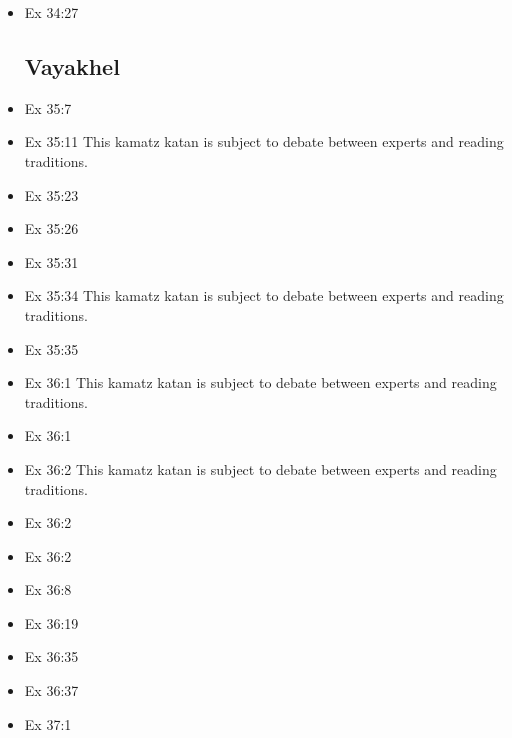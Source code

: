 \documentclass[14pt]{book}
\begin{document}
\begin{multicols}{2}
\begin{itemize}
\item Ex 34:27

\subsection{Vayakhel}

\item Ex 35:7

\item Ex 35:11 This kamatz katan is subject to debate between experts and reading traditions.

\item Ex 35:23

\item Ex 35:26

\item Ex 35:31

\item Ex 35:34 This kamatz katan is subject to debate between experts and reading traditions.

\item Ex 35:35

\item Ex 36:1 This kamatz katan is subject to debate between experts and reading traditions.

\item Ex 36:1

\item Ex 36:2 This kamatz katan is subject to debate between experts and reading traditions.

\item Ex 36:2

\item Ex 36:2

\item Ex 36:8

\item Ex 36:19

\item Ex 36:35

\item Ex 36:37

\item Ex 37:1


\end{itemize}
\end{multicols}
\end{document}
